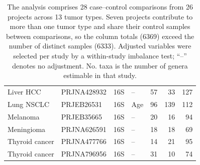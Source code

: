 \begin{table}[H]
{\begin{tabular}{llllrrr}
Liver HCC & PRJNA428932 & 16S & -- &  57 &  33 & 127 \\
Lung NSCLC & PRJEB26531 & 16S & Age &  96 & 139 & 112 \\
Melanoma & PRJEB35665 & 16S & -- &  20 &  16 &  94 \\
Meningioma & PRJNA626591 & 16S & -- &  18 &  18 &  69 \\
Thyroid cancer & PRJNA477766 & 16S & -- &  14 &  21 &  95 \\
Thyroid cancer & PRJNA796956 & 16S & -- &  31 &  10 &  74 \\
\bottomrule
\end{tabular}
}
\caption*{\footnotesize The analysis comprises 28 case--control comparisons from 26 projects across 13 tumor types. Seven projects contribute to more than one tumor type and share their control samples between comparisons, so the column totals (6369) exceed the number of distinct samples (6333). Adjusted variables were selected per study by a within-study imbalance test; ``--'' denotes no adjustment. No. taxa is the number of genera estimable in that study.}
\end{table}
